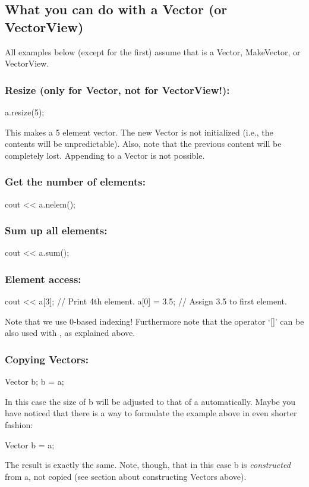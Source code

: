 \subsection{What you can do with a Vector (or VectorView)}

All examples below (except for the first) assume that  is a
Vector, MakeVector, or VectorView.

\subsubsection{Resize (only for Vector, not for VectorView!):}
\begin{code}
a.resize(5);
\end{code}
This makes  a 5 element vector. The new Vector is not
initialized (i.e., the contents will be unpredictable). Also, note
that the previous content will be completely lost. Appending to a
Vector is not possible.

\subsubsection{Get the number of elements:}
\begin{code}
cout << a.nelem();
\end{code}

\subsubsection{Sum up all elements:}
\begin{code}
cout << a.sum();
\end{code}

\subsubsection{Element access:}
\begin{code}
cout << a[3];   // Print 4th element.
a[0] = 3.5;     // Assign 3.5 to first element.
\end{code}

Note that we use 0-based indexing! Furthermore note that the operator
`[]' can be also used with , as explained above.

\subsubsection{Copying Vectors:}
\begin{code}
Vector b;
b = a;
\end{code}
In this case the size of b will be adjusted to that of a
automatically. Maybe you have noticed that there is a way to formulate the 
example above in even shorter fashion:
\begin{code}
Vector b = a;
\end{code}
The result is exactly the same. Note, though, that in this case b is
\emph{constructed} from a, not copied (see section about constructing
Vectors above). 

